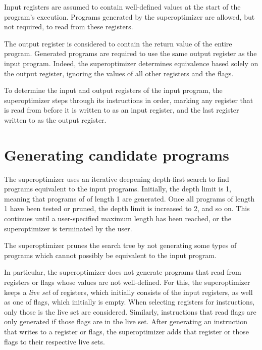 \documentclass[a4paper,11pt]{kth-mag}
\begin{document}
Input registers are assumed to contain well-defined values at the start of the program's execution.
Programs generated by the superoptimizer are allowed, but not required, to read from these registers.

The output register is considered to contain the return value of the entire program.
Generated programs are required to use the same output register as the input program.
Indeed, the superoptimizer determines equivalence based solely on the output register, ignoring the values of all other registers and the flags.

To determine the input and output registers of the input program, the superoptimizer steps through its instructions in order, marking any register that is read from before it is written to as an input register, and the last register written to as the output register.

\section{Generating candidate programs}

The superoptimizer uses an iterative deepening depth-first search to find programs equivalent to the input programs.
Initially, the depth limit is 1, meaning that programs of of length 1 are generated.
Once all programs of length 1 have been tested or pruned, the depth limit is increased to 2, and so on.
This continues until a user-specified maximum length has been reached, or the superoptimizer is terminated by the user.


The superoptimizer prunes the search tree by not generating some types of programs which cannot possibly be equivalent to the input program.

In particular, the superoptimizer does not generate programs that read from registers or flags whose values are not well-defined. %
For this, the superoptimizer keeps a \emph{live set} of registers, which initially consists of the input registers, as well as one of flags, which initially is empty.
When selecting registers for instructions, only those is the live set are considered.
Similarly, instructions that read flags are only generated if those flags are in the live set.
After generating an instruction that writes to a register or flags, the superoptimizer adds that register or those flags to their respective live sets.
\end{document}
